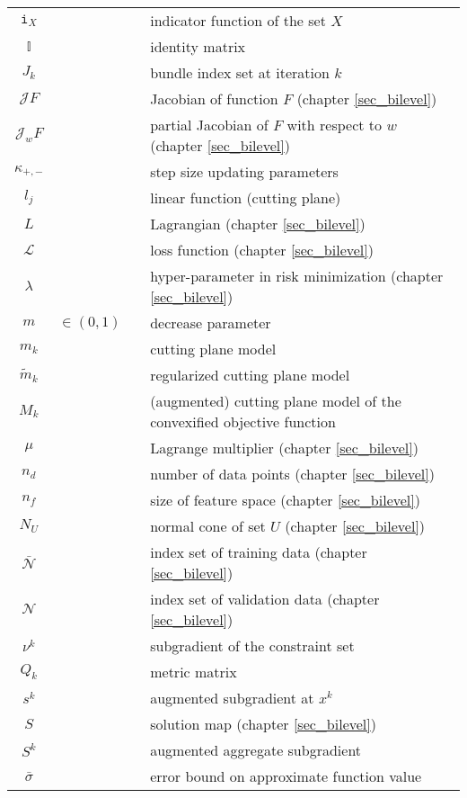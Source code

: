 \begin{longtable}{c@{}c@{} l@{}}
	\(\mathtt{i}_X\) && indicator function of the set \(X\) \\
	\(\mathbb{I}\) && identity matrix \\
	\(J_k\) && bundle index set at iteration \(k\) \\
	\(\mathcal{J}F\) && Jacobian of function \(F\) (chapter \ref{sec_bilevel})\\
	\(\mathcal{J}_wF\) && partial Jacobian of \(F\) with respect to \(w\) (chapter \ref{sec_bilevel})\\
	\(\kappa_{+,-}\) && step size updating parameters \\
	\(l_j\) && linear function (cutting plane) \\
	\(L\) && Lagrangian (chapter \ref{sec_bilevel}) \\
	\(\mathcal{L}\) && loss function (chapter \ref{sec_bilevel}) \\
	\(\lambda\) && hyper-parameter in risk minimization (chapter \ref{sec_bilevel}) \\
	\(m\) &\(\in (0,1) \quad\)& decrease parameter \\
	\(m_k\) && cutting plane model \\
	\(\tilde{m}_k\) && regularized cutting plane model \\
	\(M_k\) && (augmented) cutting plane model of the convexified objective function \\
	\(\mu\) && Lagrange multiplier (chapter \ref{sec_bilevel}) \\
	\(n_d\) && number of data points (chapter \ref{sec_bilevel}) \\
	\(n_f\) && size of feature space (chapter \ref{sec_bilevel}) \\
	\(N_U\) && normal cone of set \(U\) (chapter \ref{sec_bilevel}) \\
	\(\mathcal{\bar{N}}\) && index set of training data (chapter \ref{sec_bilevel}) \\
	\(\mathcal{N}\) && index set of validation data (chapter \ref{sec_bilevel}) \\
	\(\nu^k\) && subgradient of the constraint set \\
	\(Q_k\) && metric matrix \\
	\(s^k\) && augmented subgradient at \(x^k\) \\
	\(S\) && solution map (chapter \ref{sec_bilevel}) \\
	\(S^k\) && augmented aggregate subgradient \\
	\(\bar{\sigma}\) && error bound on approximate function value \\

\end{longtable}
